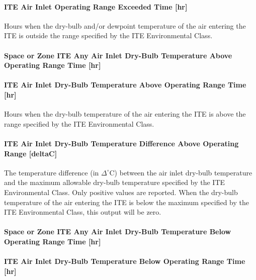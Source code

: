 \paragraph{ITE Air Inlet Operating Range Exceeded Time {[}hr{]}}\label{ite-air-inlet-operating-range-exceeded-time-hr}

Hours when the dry-bulb and/or dewpoint temperature of the air entering the ITE is outside the range specified by the ITE Environmental Class.

\paragraph{Space or Zone ITE Any Air Inlet Dry-Bulb Temperature Above Operating Range Time {[}hr{]}}\label{zone-ite-any-air-inlet-dry-bulb-temperature-above-operating-range-time-hr}

\paragraph{ITE Air Inlet Dry-Bulb Temperature Above Operating Range Time {[}hr{]}}\label{ite-air-inlet-dry-bulb-temperature-above-operating-range-time-hr}

Hours when the dry-bulb temperature of the air entering the ITE is above the range specified by the ITE Environmental Class.

\paragraph{ITE Air Inlet Dry-Bulb Temperature Difference Above Operating Range {[}deltaC{]}}\label{ite-air-inlet-dry-bulb-temperature-difference-above-operating-range-deltac}

The temperature difference (in $\Delta^\circ$C) between the air inlet dry-bulb temperature and the maximum allowable dry-bulb temperature specified by the ITE Environmental Class. Only positive values are reported. When the dry-bulb temperature of the air entering the ITE is below the maximum specified by the ITE Environmental Class, this output will be zero.

\paragraph{Space or Zone ITE Any Air Inlet Dry-Bulb Temperature Below Operating Range Time {[}hr{]}}\label{zone-ite-any-air-inlet-dry-bulb-temperature-below-operating-range-time-hr}

\paragraph{ITE Air Inlet Dry-Bulb Temperature Below Operating Range Time {[}hr{]}}\label{ite-air-inlet-dry-bulb-temperature-below-operating-range-time-hr}

